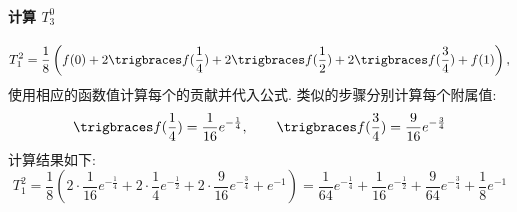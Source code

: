 \documentclass[lang = zh]{iwork}
\begin{document}
\begin{sol}
  \paragraph{计算 $T_3^0$}
  \begin{equation*}
    T_1^2
    = \frac{1}{8} \left( f(0) + 2\f(\frac{1}{4}) + 2\f(\frac{1}{2}) + 2\f(\frac{3}{4}) + f(1) \right),
  \end{equation*}
  使用相应的函数值计算每个的贡献并代入公式.
  类似的步骤分别计算每个附属值:
  \begin{equation*}
    \f(\frac{1}{4}) = \frac{1}{16} e^{-\frac{1}{4}}, \qquad
    \f(\frac{3}{4}) = \frac{9}{16} e^{-\frac{3}{4}}
  \end{equation*}
  计算结果如下:
  \begin{equation*}
    T_1^2
    = \frac{1}{8} \left( 2 \cdot \frac{1}{16} e^{-\frac{1}{4}} + 2 \cdot \frac{1}{4} e^{-\frac{1}{2}} + 2 \cdot \frac{9}{16} e^{-\frac{3}{4}} + e^{-1} \right)
    = \frac{1}{64} e^{-\frac{1}{4}} + \frac{1}{16} e^{-\frac{1}{2}} + \frac{9}{64} e^{-\frac{3}{4}} + \frac{1}{8} e^{-1}
  \end{equation*}


\end{sol}
\end{document}
